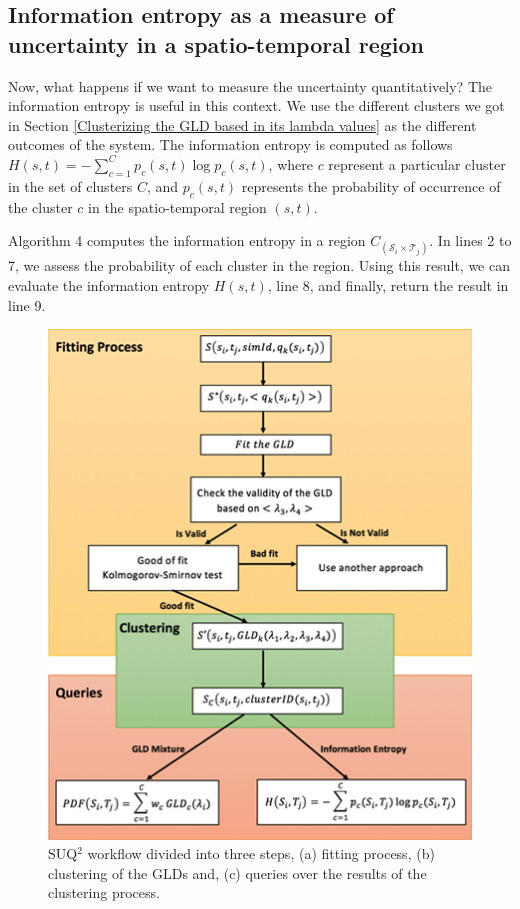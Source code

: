 \documentclass[11pt]{article}
\begin{document}
\subsection{Information entropy as a measure of uncertainty in a spatio-temporal region}
\label{sub:InfomationEntropyRegionWorkflow}
Now, what happens if we want to measure the uncertainty quantitatively? The information entropy is useful in this context. We use the different clusters we got in Section \ref{Clusterizing the GLD based in its lambda values} as the different outcomes of the system. The information entropy is computed as follows $H(s,t)=-\sum_{c=1}^C p_{c}(s,t)\log p_{c}(s,t)$, where $c$ represent a particular cluster in the set of clusters $C$, and $p_{c}(s,t)$ represents the probability of occurrence of the cluster $c$ in the spatio-temporal region $(s,t)$.

Algorithm 4 computes the information entropy in a region $C_{(\mathcal{S}_{i} \times \mathcal{T}_{j})}$. In lines 2 to 7, we assess the probability of each cluster in the region. Using this result, we can evaluate the information entropy $H(s, t)$, line 8, and finally, return the result in line 9.


\begin{figure}[!ht]
\vspace{-1cm}
    \centering
    \includegraphics{figs/Diagram.png}
    \caption{SUQ$^2$ workflow divided into three steps, (a) fitting process, (b) clustering of the GLDs and, (c) queries over the results of the clustering process.}
    \label{fig:workflow}
\end{figure}
\end{document}
